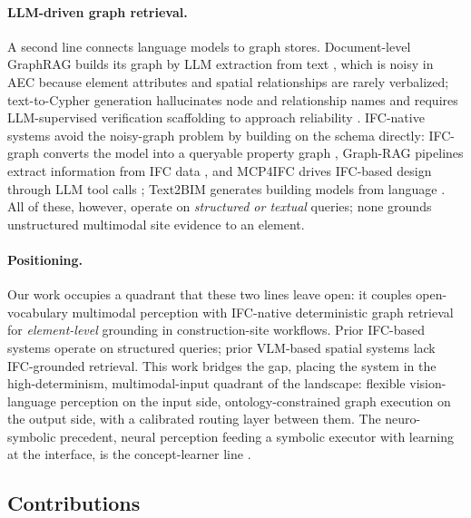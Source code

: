 \paragraph{LLM-driven graph retrieval.} A second line connects language models to graph stores.
Document-level GraphRAG builds its graph by LLM extraction from text \citep{edge2024graphrag}, which
is noisy in AEC because element attributes and spatial relationships are rarely verbalized;
text-to-Cypher generation hallucinates node and relationship names and requires LLM-supervised
verification scaffolding to approach reliability \citep{tiwari2024autocypher, gusarov2025graphrag}.
IFC-native systems avoid the noisy-graph problem by building on the schema directly: IFC-graph
converts the model into a queryable property graph \citep{zhu2023ifcgraph}, Graph-RAG pipelines
extract information from IFC data \citep{iranmanesh2025ifcgraphrag}, and MCP4IFC drives IFC-based
design through LLM tool calls \citep{nithyanantham2025mcp4ifc}; Text2BIM generates building models
from language \citep{du2024text2bim}. All of these, however, operate on \emph{structured or textual}
queries; none grounds unstructured multimodal site evidence to an element.

\paragraph{Positioning.} Our work occupies a quadrant that these two lines leave open: it couples
open-vocabulary multimodal perception with IFC-native deterministic graph retrieval for
\emph{element-level} grounding in construction-site workflows. Prior IFC-based systems
\citep{nithyanantham2025mcp4ifc, iranmanesh2025ifcgraphrag} operate on structured queries; prior
VLM-based spatial systems \citep{chen2024spatialvlm} lack IFC-grounded retrieval. This work bridges
the gap, placing the system in the high-determinism, multimodal-input quadrant of the landscape:
flexible vision-language perception on the input side, ontology-constrained graph execution on the
output side, with a calibrated routing layer between them. The neuro-symbolic precedent, neural
perception feeding a symbolic executor with learning at the interface, is the concept-learner
line \citep{mao2019nscl}.

\subsection{Contributions}

